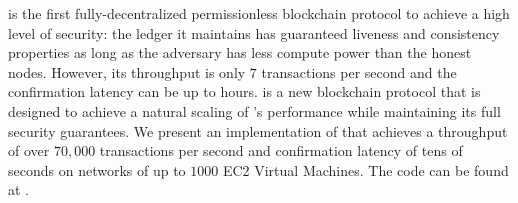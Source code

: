 % 
% 
%
\bitcoin is the first fully-decentralized permissionless blockchain protocol to achieve a high level of security: the ledger it maintains has guaranteed liveness and consistency properties as long as the adversary has less compute power than the honest nodes. However, its throughput is only $7$ transactions per second and the confirmation latency can be up to hours. \prism is a new blockchain protocol that is designed to achieve a natural scaling of \bitcoin's performance while maintaining its full security guarantees. We present an implementation of \prism that achieves a throughput of over $70,000$ transactions per second and confirmation latency of tens of seconds on networks of up to $1000$ EC2 Virtual Machines. The code can be found at \cite{prismcode}.
